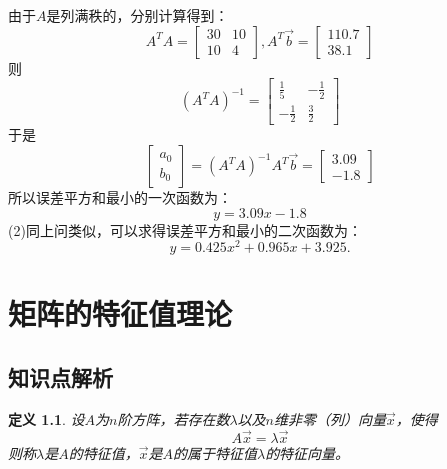 \documentclass[a4paper]{book}
\newtheorem{Def}{定义}[chapter]
\begin{document}
由于$A$是列满秩的，分别计算得到：
\begin{equation*}
  A^TA=\begin{bmatrix}30&10\\10&4\end{bmatrix},A^T\vec{b}=\begin{bmatrix}110.7\\38.1\end{bmatrix}
\end{equation*}
则
\begin{equation*}
  (A^TA)^{-1}=\begin{bmatrix}\frac{1}{5}&-\frac{1}{2}\\-\frac{1}{2}&\frac{3}{2}\end{bmatrix}
\end{equation*}
于是
\begin{equation*}
 \begin{bmatrix}a_0\\b_0\end{bmatrix}=(A^TA)^{-1}A^T\vec{b}=\begin{bmatrix}3.09\\-1.8\end{bmatrix}
\end{equation*}
所以误差平方和最小的一次函数为：
\begin{equation*}
 y=3.09x-1.8
\end{equation*}
(2)同上问类似，可以求得误差平方和最小的二次函数为：
\begin{equation*}
 y=0.425x^2+0.965x+3.925.
\end{equation*}


\chapter{矩阵的特征值理论}

\section{知识点解析}

\begin{Def}
设$A$为$n$阶方阵，若存在数$\lambda$以及$n$维非零（列）向量$\vec{x}$，使得
$$
A\vec{x}=\lambda\vec{x}
$$
则称$\lambda$是$A$的特征值，$\vec{x}$是$A$的属于特征值$\lambda$的特征向量。
\end{Def}
\end{document}

